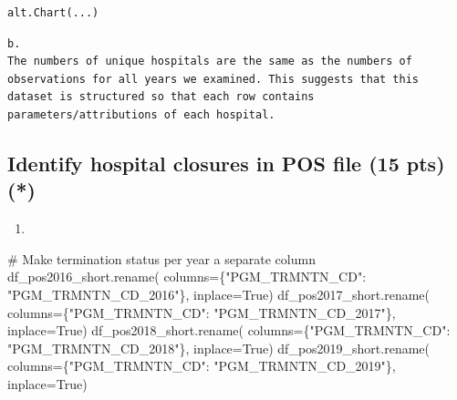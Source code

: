 \documentclass[
  letterpaper,
  DIV=11,
  numbers=noendperiod]{scrartcl}
\newenvironment{Shaded}{\begin{snugshade}}{\end{snugshade}}
\newcommand{\CommentTok}[1]{\textcolor[rgb]{0.37,0.37,0.37}{#1}}
\newcommand{\NormalTok}[1]{\textcolor[rgb]{0.00,0.23,0.31}{#1}}
\newcommand{\OperatorTok}[1]{\textcolor[rgb]{0.37,0.37,0.37}{#1}}
\newcommand{\StringTok}[1]{\textcolor[rgb]{0.13,0.47,0.30}{#1}}
\newcommand{\VariableTok}[1]{\textcolor[rgb]{0.07,0.07,0.07}{#1}}
\providecommand{\tightlist}{%
  \setlength{\itemsep}{0pt}\setlength{\parskip}{0pt}}\usepackage{longtable,booktabs,array}
\begin{document}
\begin{verbatim}
alt.Chart(...)
\end{verbatim}

\begin{verbatim}
b.
The numbers of unique hospitals are the same as the numbers of observations for all years we examined. This suggests that this dataset is structured so that each row contains parameters/attributions of each hospital.
\end{verbatim}

\subsection{Identify hospital closures in POS file (15 pts)
(*)}\label{identify-hospital-closures-in-pos-file-15-pts}

\begin{enumerate}
\def\labelenumi{\arabic{enumi}.}
\tightlist
\item
\end{enumerate}

\begin{Shaded}
\begin{Highlighting}[]
\CommentTok{\# Make termination status per year a separate column}
\NormalTok{df\_pos2016\_short.rename(}
\NormalTok{    columns}\OperatorTok{=}\NormalTok{\{}\StringTok{"PGM\_TRMNTN\_CD"}\NormalTok{: }\StringTok{"PGM\_TRMNTN\_CD\_2016"}\NormalTok{\}, inplace}\OperatorTok{=}\VariableTok{True}\NormalTok{)}
\NormalTok{df\_pos2017\_short.rename(}
\NormalTok{    columns}\OperatorTok{=}\NormalTok{\{}\StringTok{"PGM\_TRMNTN\_CD"}\NormalTok{: }\StringTok{"PGM\_TRMNTN\_CD\_2017"}\NormalTok{\}, inplace}\OperatorTok{=}\VariableTok{True}\NormalTok{)}
\NormalTok{df\_pos2018\_short.rename(}
\NormalTok{    columns}\OperatorTok{=}\NormalTok{\{}\StringTok{"PGM\_TRMNTN\_CD"}\NormalTok{: }\StringTok{"PGM\_TRMNTN\_CD\_2018"}\NormalTok{\}, inplace}\OperatorTok{=}\VariableTok{True}\NormalTok{)}
\NormalTok{df\_pos2019\_short.rename(}
\NormalTok{    columns}\OperatorTok{=}\NormalTok{\{}\StringTok{"PGM\_TRMNTN\_CD"}\NormalTok{: }\StringTok{"PGM\_TRMNTN\_CD\_2019"}\NormalTok{\}, inplace}\OperatorTok{=}\VariableTok{True}\NormalTok{)}
\end{Highlighting}
\end{Shaded}
\end{document}
